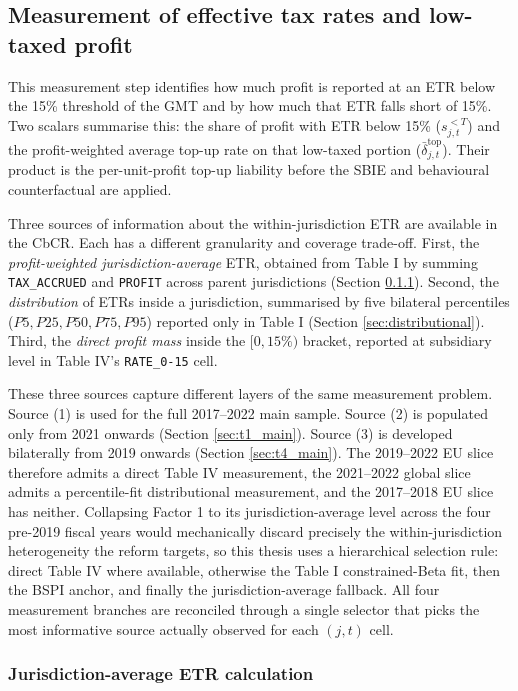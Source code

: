 \documentclass[11pt,a4paper]{article}
\newcommand{\code}[1]{\texttt{#1}}
\begin{document}
\subsection{Measurement of effective tax rates and low-taxed profit}\label{sec:etr_measurement}

This measurement step identifies how much profit is reported at an ETR below the 15\% threshold of the GMT and by how much that ETR falls short of 15\%. Two scalars summarise this: the share of profit with ETR below 15\% ($s_{j,t}^{<T}$) and the profit-weighted average top-up rate on that low-taxed portion ($\bar{\delta}_{j,t}^{\text{top}}$). Their product is the per-unit-profit top-up liability before the SBIE and behavioural counterfactual are applied.

Three sources of information about the within-jurisdiction ETR are available in the CbCR. Each has a different granularity and coverage trade-off. First, the \emph{profit-weighted jurisdiction-average} ETR, obtained from Table I by summing \code{TAX\_ACCRUED} and \code{PROFIT} across parent jurisdictions (Section \ref{sec:etr_calc}). Second, the \emph{distribution} of ETRs inside a jurisdiction, summarised by five bilateral percentiles ($P5, P25, P50, P75, P95$) reported only in Table I (Section \ref{sec:distributional}). Third, the \emph{direct profit mass} inside the $[0, 15\%)$ bracket, reported at subsidiary level in Table IV's \code{RATE\_0-15} cell.

These three sources capture different layers of the same measurement problem. Source (1) is used for the full 2017--2022 main sample. Source (2) is populated only from 2021 onwards (Section \ref{sec:t1_main}). Source (3) is developed bilaterally from 2019 onwards (Section \ref{sec:t4_main}). The 2019--2022 EU slice therefore admits a direct Table IV measurement, the 2021--2022 global slice admits a percentile-fit distributional measurement, and the 2017--2018 EU slice has neither. Collapsing Factor 1 to its jurisdiction-average level across the four pre-2019 fiscal years would mechanically discard precisely the within-jurisdiction heterogeneity the reform targets, so this thesis uses a hierarchical selection rule: direct Table IV where available, otherwise the Table I constrained-Beta fit, then the BSPI anchor, and finally the jurisdiction-average fallback. All four measurement branches are reconciled through a single selector that picks the most informative source actually observed for each $(j,t)$ cell.

\subsubsection{Jurisdiction-average ETR calculation}\label{sec:etr_calc}
\end{document}
